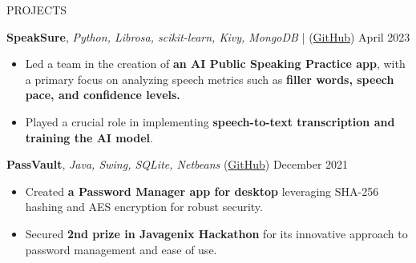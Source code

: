 \documentclass{resume} %
\begin{document}
\begin{rSection}{PROJECTS}
    \item \textbf{SpeakSure}, \textit{Python, Librosa, scikit-learn, Kivy, MongoDB} | (\href{https://github.com/ninadnaik10/SpeakSure} {GitHub}) \hfill {April 2023}
    \begin{itemize}
        \setlength\itemsep{-0.6em}
        \item  Led a team in the creation of \textbf{an AI Public Speaking Practice app}, with a primary focus on analyzing speech metrics such as \textbf{filler words, speech pace, and confidence levels.}
        \item Played a crucial role in implementing \textbf{speech-to-text transcription and training the AI model}.
    \end{itemize}
    \item \textbf{PassVault}, \textit{Java, Swing, SQLite, Netbeans} (\href{https://github.com/ninadnaik10/PassVault} {GitHub}) \hfill {December 2021}
    \begin{itemize}
        \setlength\itemsep{-0.6em}
        \item Created \textbf{a Password Manager app for desktop} leveraging SHA-256 hashing and AES encryption for robust security.
        \item Secured \textbf{2nd prize in Javagenix Hackathon} for its innovative approach to password management and ease of use.
    \end{itemize}

\end{rSection}
\end{document}
